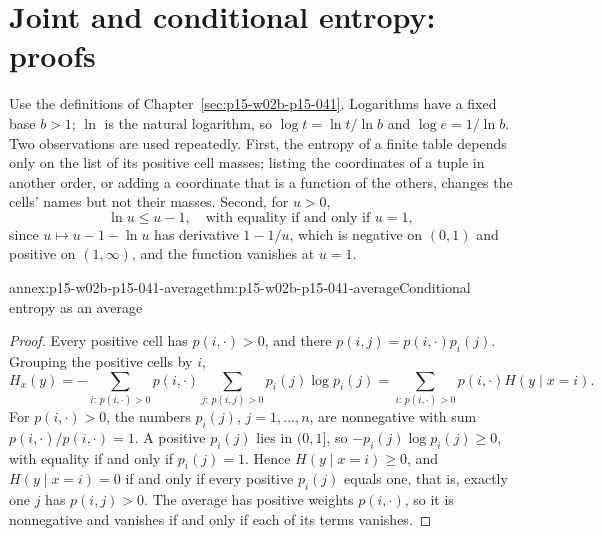 \section{Joint and conditional entropy: proofs}
\label{sec:annex-p15-w02b-p15-041}

Use the definitions of Chapter~\ref{sec:p15-w02b-p15-041}. Logarithms
have a fixed base \(b>1\); \(\ln\) is the natural logarithm, so
\(\log t=\ln t/\ln b\) and \(\log e=1/\ln b\). Two observations are
used repeatedly. First, the entropy of a finite table depends only on
the list of its positive cell masses; listing the coordinates of a
tuple in another order, or adding a coordinate that is a function of
the others, changes the cells' names but not their masses. Second, for
\(u>0\),
\[
 \ln u\leq u-1,\quad\text{with equality if and only if }u=1,
 \tag{L}
\]
since \(u\mapsto u-1-\ln u\) has derivative \(1-1/u\), which is
negative on \((0,1)\) and positive on \((1,\infty)\), and the function
vanishes at \(u=1\).

\begin{annexitem}{annex:p15-w02b-p15-041-average}{thm:p15-w02b-p15-041-average}{Conditional entropy as an average}
\begin{proof}
Every positive cell has \(p(i,\cdot)>0\), and there
\(p(i,j)=p(i,\cdot)p_i(j)\). Grouping the positive cells by \(i\),
\[
 H_x(y)=-\sum_{i:\,p(i,\cdot)>0}p(i,\cdot)\sum_{j:\,p(i,j)>0}p_i(j)\log p_i(j)
       =\sum_{i:\,p(i,\cdot)>0}p(i,\cdot)H(y\mid x=i).
\]
For \(p(i,\cdot)>0\), the numbers \(p_i(j)\), \(j=1,\ldots,n\), are
nonnegative with sum \(p(i,\cdot)/p(i,\cdot)=1\). A positive
\(p_i(j)\) lies in \((0,1]\), so \(-p_i(j)\log p_i(j)\geq0\), with
equality if and only if \(p_i(j)=1\). Hence \(H(y\mid x=i)\geq0\), and
\(H(y\mid x=i)=0\) if and only if every positive \(p_i(j)\) equals one,
that is, exactly one \(j\) has \(p(i,j)>0\). The average has positive
weights \(p(i,\cdot)\), so it is nonnegative and vanishes if and only
if each of its terms vanishes.
\end{proof}
\end{annexitem}

